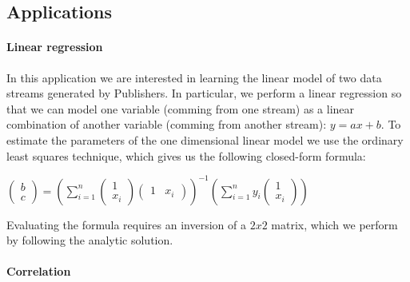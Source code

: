 \subsection{Applications}

\paragraph{Linear regression}



In this application we are interested in learning the linear model of two data
streams generated by Publishers.  In particular, we perform a linear regression
so that we can model one variable (comming from one stream) as a linear
combination of another variable (comming from another stream): $y = ax + b$.
To estimate the parameters of the one dimensional linear model we use the
ordinary least squares technique, which gives us the following closed-form
formula:

$\begin{pmatrix} b \\ c \end{pmatrix} =
\left( \displaystyle\sum_{i=1}^n \begin{pmatrix} 1 \\ x_i \end{pmatrix}
  \begin{pmatrix} 1 & x_i\end{pmatrix}\right)^{-1}
\left( \displaystyle\sum_{i=1}^n y_i \begin{pmatrix} 1 \\ x_i \end{pmatrix}\right)$

Evaluating the formula requires an inversion of a $2 x 2$ matrix, which we perform
by following the analytic solution.

\paragraph{Correlation}



